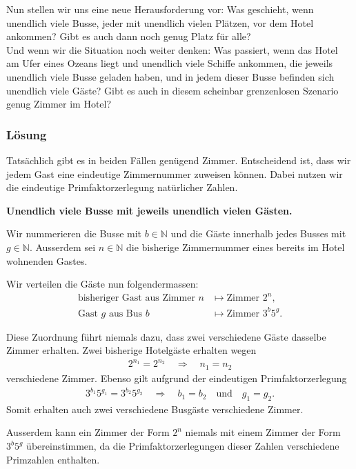 \documentclass[a4paper,10pt]{article}
\newcommand{\N}{\mathbb{N}}
\newcommand{\s}[1]{#1}
\begin{document}
Nun stellen wir uns eine neue Herausforderung vor: Was geschieht, wenn unendlich viele Busse, jeder mit unendlich vielen Plätzen, vor dem Hotel ankommen? Gibt es auch dann noch genug Platz für alle?\\

Und wenn wir die Situation noch weiter denken: Was passiert, wenn das Hotel am Ufer eines Ozeans liegt und unendlich viele Schiffe ankommen, die jeweils unendlich viele Busse geladen haben, und in jedem dieser Busse befinden sich unendlich viele Gäste? Gibt es auch in diesem scheinbar grenzenlosen Szenario genug Zimmer im Hotel?


\s{\subsubsection*{Lösung}

Tatsächlich gibt es in beiden Fällen genügend Zimmer. Entscheidend ist, dass wir jedem Gast eine eindeutige Zimmernummer zuweisen können. Dabei nutzen wir die eindeutige Primfaktorzerlegung natürlicher Zahlen.

\textbf{Unendlich viele Busse mit jeweils unendlich vielen Gästen.}

Wir nummerieren die Busse mit $b\in\N$ und die Gäste innerhalb jedes Busses mit $g\in\N$. Ausserdem sei $n\in\N$ die bisherige Zimmernummer eines bereits im Hotel wohnenden Gastes.

Wir verteilen die Gäste nun folgendermassen:
\begin{align*}
    \text{bisheriger Gast aus Zimmer }n
    &\longmapsto \text{Zimmer }2^n,\\
    \text{Gast }g\text{ aus Bus }b
    &\longmapsto \text{Zimmer }3^b5^g.
\end{align*}

Diese Zuordnung führt niemals dazu, dass zwei verschiedene Gäste dasselbe Zimmer erhalten. Zwei bisherige Hotelgäste erhalten wegen
\begin{align*}
    2^{n_1}=2^{n_2}
    \quad\Longrightarrow\quad
    n_1=n_2
\end{align*}
verschiedene Zimmer. Ebenso gilt aufgrund der eindeutigen Primfaktorzerlegung
\begin{align*}
    3^{b_1}5^{g_1}=3^{b_2}5^{g_2}
    \quad\Longrightarrow\quad
    b_1=b_2
    \quad\text{und}\quad
    g_1=g_2.
\end{align*}
Somit erhalten auch zwei verschiedene Busgäste verschiedene Zimmer.

Ausserdem kann ein Zimmer der Form $2^n$ niemals mit einem Zimmer der Form $3^b5^g$ übereinstimmen, da die Primfaktorzerlegungen dieser Zahlen verschiedene Primzahlen enthalten.

}
\end{document}

